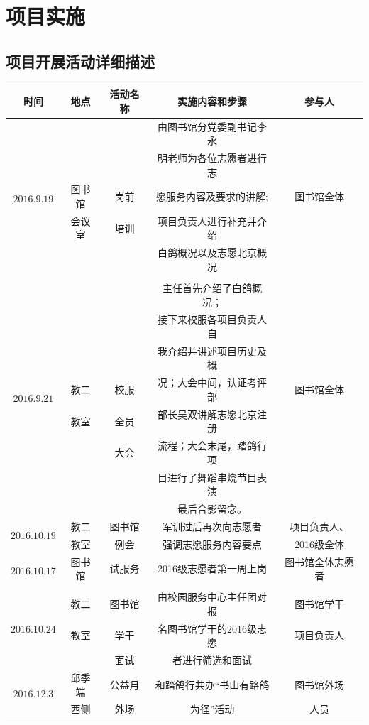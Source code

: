 \documentclass[nocover]{lizhechen}
\begin{document}
	\section{项目实施}
	\subsection{项目开展活动详细描述}
	\begin{table}[H]
		\begin{center}
			\begin{tabular}{|c|c|c|c|c|}
				\hline
				时间 & 地点 & 活动名称 & 实施内容和步骤 & 参与人 \\
				\hline
				\multirow{6}{2cm}{$2016.9.19$} &  &  & 由图书馆分党委副书记李永 & \\
									& &  & 明老师为各位志愿者进行志 & \\
									& 图书馆 & 岗前 & 愿服务内容及要求的讲解;  & 图书馆全体 \\
									& 会议室 & 培训 & 项目负责人进行补充并介绍 & \\
									& &      & 白鸽概况以及志愿北京概况 & \\
									& & & &\\
				\hline
				\multirow{8}{2cm}{$2016.9.21$} &  &  & 主任首先介绍了白鸽概况； & \\
						 &  &  & 接下来校服各项目负责人自 & \\
						 & &   & 我介绍并讲述项目历史及概 & \\
						 & 教二 &    校服   & 况；大会中间，认证考评部 & 图书馆全体 \\
						 & 教室 &   全员    & 部长吴双讲解志愿北京注册 & \\
						 & &    大会   & 流程；大会末尾，踏鸽行项 & \\
						 & &       & 目进行了舞蹈串烧节目表演 & \\
						 & &       & 最后合影留念。 & \\
				\hline
				\multirow{2}{2cm}{$2016.10.19$} & 教二 & 图书馆 & 军训过后再次向志愿者 & 项目负责人、 \\
						 & 教室 & 例会 & 强调志愿服务内容要点 & 2016级全体\\
				\hline
				\multirow{2}{2cm}{$2016.10.17$} & 图书馆 & 试服务 & 2016级志愿者第一周上岗 & 图书馆全体志愿者 \\
							$\sim2016.10.23$ & & & &\\
				\hline
				\multirow{3}{2cm}{$2016.10.24$} & 教二 & 图书馆 & 由校园服务中心主任团对报 & 图书馆学干 \\
							& 教室 & 学干 & 名图书馆学干的2016级志愿 & 项目负责人\\
							& &面试  & 者进行筛选和面试 & \\
				\hline
				\multirow{2}{2cm}{$2016.12.3$} & 邱季端 & 公益月 & 和踏鸽行共办“书山有路鸽 & 图书馆外场 \\
							& 西侧 & 外场 & 为径”活动 & 人员 \\
				\hline
			\end{tabular}
		\end{center}
	\end{table}
	
\end{document}
